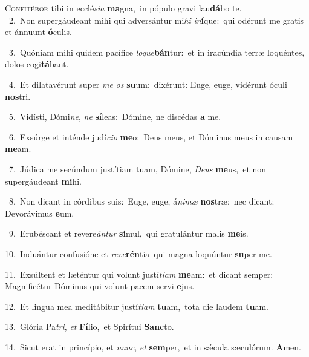 \lettrine{\initial\textcolor{\initialcolor}{C}}{onfitébor} tibi in ecclé\-\textit{si}\-\textit{a} \textbf{ma}\-gna,~\star in pópulo gravi lau\-\textbf{dá}\-bo te.\\
{\numbfont\textcolor{\numbcolor}{~2.}}~Non supergáudeant mihi qui adversántur mi\textit{hi} \textit{in}\-\textbf{í}que:~\star qui odérunt me gratis et ánnuunt \textbf{ó}\-culis.\par
{\numbfont\textcolor{\numbcolor}{~3.}}~Quóniam mihi quidem pacífice \textit{lo}\-\textit{que}\textbf{bán}tur:~\star et in iracúndia terræ loquéntes, dolos cogi\-\textbf{tá}\-bant.\par
{\numbfont\textcolor{\numbcolor}{~4.}}~Et dilatavérunt super \textit{me} \textit{os} \textbf{su}\-um:~\star dixérunt: Euge, euge, vidérunt óculi \textbf{nos}\-tri.\par
{\numbfont\textcolor{\numbcolor}{~5.}}~Vidísti, Dómi\-\textit{ne}\-, \textit{ne} \textbf{sí}\-leas:~\star Dómine, ne discédas \textbf{a} me.\par
{\numbfont\textcolor{\numbcolor}{~6.}}~Exsúrge et inténde judí\-\textit{ci}\-\textit{o} \textbf{me}\-o:~\star Deus meus, et Dóminus meus in causam \textbf{me}\-am.\par
{\numbfont\textcolor{\numbcolor}{~7.}}~Júdica me secúndum justítiam tuam, Dómine, \textit{De}\-\textit{us} \textbf{me}\-us,~\star et non supergáudeant \textbf{mi}\-hi.\par
{\numbfont\textcolor{\numbcolor}{~8.}}~Non dicant in córdibus suis:~\dagger Euge, euge, á\-\textit{ni}\-\textit{mæ} \textbf{nos}\-træ:~\star nec dicant: Devorávimus \textbf{e}\-um.\par
{\numbfont\textcolor{\numbcolor}{~9.}}~Erubéscant et revere\-\textit{án}\-\textit{tur} \textbf{si}\-mul,~\star qui gratulántur malis \textbf{me}\-is.\par
{\numbfont\textcolor{\numbcolor}{10.}}~Induántur confusióne et \textit{re}\-\textit{ve}\textbf{rén}tia~\star qui magna loquúntur \textbf{su}\-per me.\par
{\numbfont\textcolor{\numbcolor}{11.}}~Exsúltent et læténtur qui volunt justí\-\textit{ti}\-\textit{am} \textbf{me}\-am:~\star et dicant semper: Magnificétur Dóminus qui volunt pacem servi \textbf{e}\-jus.\par
{\numbfont\textcolor{\numbcolor}{12.}}~Et lingua mea meditábitur justí\-\textit{ti}\-\textit{am} \textbf{tu}\-am,~\star tota die laudem \textbf{tu}\-am.\par
{\numbfont\textcolor{\numbcolor}{13.}}~Glória Pa\-\textit{tri}\-, \textit{et} \textbf{Fí}\-lio,~\star et Spirítui \textbf{Sanc}\-to.\par
{\numbfont\textcolor{\numbcolor}{14.}}~Sicut erat in princípio, et \textit{nunc}\-, \textit{et} \textbf{sem}\-per,~\star et in sǽcula sæculórum. \textbf{A}\-men.\par
